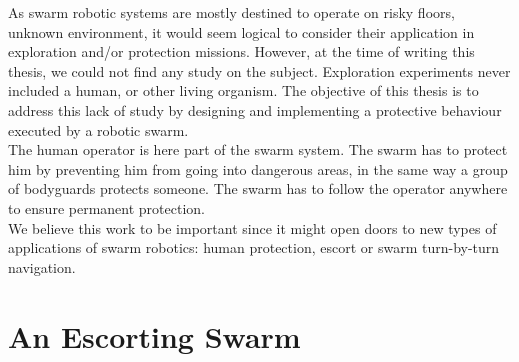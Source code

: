 \documentclass[oneside, a4paper, 12pt]{memoir}
\begin{document}

	
		
		
	
	As swarm robotic systems are mostly destined to operate on risky floors, unknown environment, it would seem logical to consider their application in exploration and/or protection missions. However, at the time of writing this thesis, we could not find any study on the subject. Exploration experiments never included a human, or other living organism. The objective of this thesis is to address this lack of study by designing and implementing a protective behaviour executed by a robotic swarm.\\
	The human operator is here part of the swarm system. The swarm has to protect him by preventing him from going into dangerous areas, in the same way a group of bodyguards protects someone. The swarm has to follow the operator anywhere to ensure permanent protection.\\
	We believe this work to be important since it might open doors to new types of applications of swarm robotics: human protection, escort or swarm turn-by-turn navigation.

\chapter{An Escorting Swarm}
\label{chap:escorting_swarm}

\end{document}
